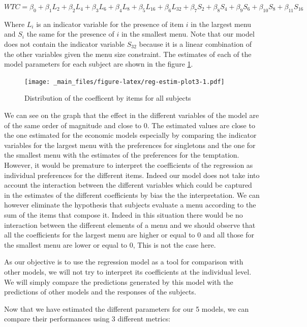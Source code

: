 \documentclass[
]{book}
\begin{document}
\[
WTC = \beta_0 + \beta_1 L_2 + \beta_2 L_4 + \beta_3 L_6 + \beta_4 L_8 + 
\beta_5 L_{16} + \beta_6 L_{32} + 
\beta_7 S_2 + \beta_8 S_4 + \beta_9 S_6 + \beta_{10} S_8 + \beta_{11} S_{16}
\]

Where \(L_i\) is an indicator variable for the presence of item \(i\) in the largest
menu and \(S_i\) the same for the presence of \(i\) in the smallest menu.
Note that our model does not contain the indicator variable \(S_{32}\) because it
is a linear combination of the other variables given the menu size constraint.
The estimates of each of the model parameters for each subject are shown in the
figure \ref{fig:reg-estim-plot3}.

\begin{figure}
\centering
\texttt{[image: \_main\_files/figure-latex/reg-estim-plot3-1.pdf]}
\caption{\label{fig:reg-estim-plot3}Distribution of the coefficent by items for all subjects}
\end{figure}

We can see on the graph that the effect in the different variables of the model
are of the same order of magnitude and close to 0.
The estimated values are close to the one estimated for the economic models
especially by comparing the indicator variables for the largest menu with the
preferences for singletons and the one for the smallest menu with the estimates
of the preferences for the temptation. However, it would be premature to
interpret the coefficients of the regression as individual preferences for the
different items.
Indeed our model does not take into account the interaction between the
different variables which could be captured in the estimates of the different
coefficients by bias the the interpretation.
We can however eliminate the hypothesis that subjects evaluate a menu according
to the sum of the items that compose it.
Indeed in this situation there would be no interaction between the different
elements of a menu and we should observe that all the coefficients for the
largest menu are higher or equal to 0 and all those for the smallest menu are
lower or equal to 0, This is not the case here.

As our objective is to use the regression model as a tool for comparison with
other models, we will not try to interpret its coefficients at the individual
level.
We will simply compare the predictions generated by this model with the
predictions of other models and the responses of the subjects.

Now that we have estimated the different parameters for our 5 models, we can
compare their performances using 3 different metrics:
\end{document}
